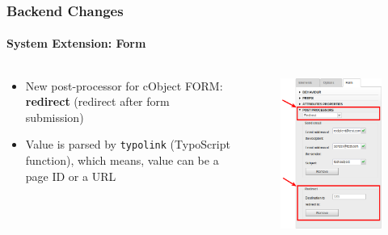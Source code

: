 \begin{frame}[fragile]
	\frametitle{Backend Changes}
	\framesubtitle{System Extension: Form}

	\begin{columns}[T]

		\begin{column}{.5\textwidth}
			\begin{itemize}
				\item New post-processor for cObject FORM: \textbf{redirect}\newline
					(redirect after form submission)
				\item Value is parsed by \texttt{typolink} (TypoScript function),\newline
					which means, value can be a page ID or a URL
			\end{itemize}
		\end{column}

		\begin{column}{.5\textwidth}
			\begin{figure}\vspace*{-0.4cm}
				\includegraphics[width=0.65\linewidth]{Images/BackendChanges/FormRedirectPostProcessor.png}
			\end{figure}
		\end{column}

	\end{columns}

\end{frame}

